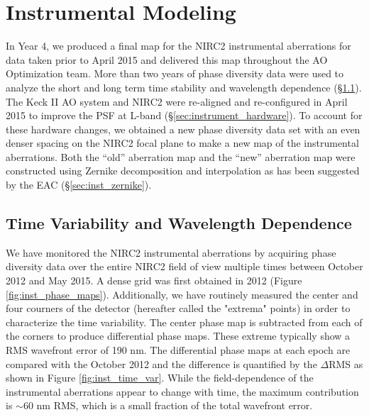 \section{Instrumental Modeling}
\label{sec:instrument}

In Year 4, we produced a final map for the NIRC2 instrumental
aberrations for data taken prior to April 2015 and delivered this map
throughout the AO Optimization team. More than two years of
phase diversity data were used to analyze the short and long term time
stability and wavelength dependence (\S\ref{sec:instrument_time}).
The Keck \textrm{II} AO system and NIRC2 were re-aligned and
re-configured in April 2015 to improve the PSF at L-band
(\S\ref{sec:instrument_hardware}). To account for these hardware changes, we 
obtained a new phase diversity data set with an even denser spacing on
the NIRC2 focal plane to make a new map of the instrumental
aberrations.
Both the ``old'' aberration map and the ``new'' aberration map were
constructed using Zernike decomposition and interpolation as has been
suggested by the EAC (\S\ref{sec:inst_zernike}).

\subsection{Time Variability and Wavelength Dependence}
\label{sec:instrument_time}

We have monitored the NIRC2 instrumental aberrations by 
acquiring phase diversity data over the entire NIRC2 field of view
multiple times between October 2012 and May 2015. 
A dense grid was first obtained in 2012 (Figure \ref{fig:inst_phase_maps}). 
Additionally, we have routinely measured the center and four courners
of the detector
(hereafter called the "extrema" points) in order to characterize the
time variability. The center phase map is subtracted from each of the
corners to produce differential phase maps. These extreme typically
show a RMS wavefront error of 190 nm. The differential phase
maps at each epoch are compared with the October 2012 and the
difference is quantified by the $\Delta$RMS as shown in Figure
\ref{fig:inst_time_var}. 
While the field-dependence of the instrumental aberrations appear to
change with time, the maximum contribution is $\sim$60 nm RMS, which
is a small fraction of the total wavefront error. 
    
    
    
  
  
  
  
  
  